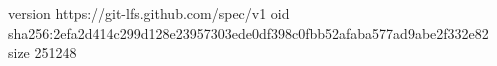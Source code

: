 version https://git-lfs.github.com/spec/v1
oid sha256:2efa2d414c299d128e23957303ede0df398c0fbb52afaba577ad9abe2f332e82
size 251248
